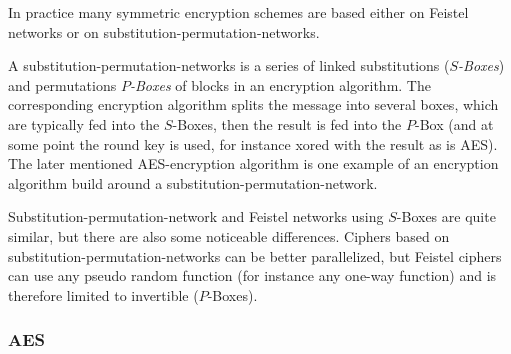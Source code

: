  In practice many symmetric encryption schemes are based either on Feistel networks or on substitution-permutation-networks. 
 \begin{definition}
  A substitution-permutation-networks is a series of linked substitutions (\emph{$S$-Boxes}) and permutations \emph{$P$-Boxes} of blocks in an encryption algorithm. 
  The corresponding encryption algorithm splits the message into several boxes, which are typically fed into the $S$-Boxes, then the result is fed into the $P$-Box (and at some point the round key is used, for instance xored with the result as is AES). The later mentioned AES-encryption algorithm is one example of an encryption algorithm build around a substitution-permutation-network.
 \end{definition}
 Substitution-permutation-network and Feistel networks using $S$-Boxes are quite similar, but there are also some noticeable differences. Ciphers based on substitution-permutation-networks can be better parallelized, but Feistel ciphers can use any pseudo random function (for instance any one-way function) and is therefore limited to invertible ($P$-Boxes). %

\subsubsection{AES}
